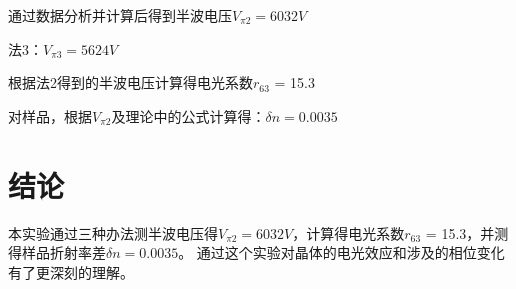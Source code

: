 \documentclass[font=default]{mpltx}
\begin{document}
通过数据分析并计算后得到半波电压$V_{\pi2} = 6032V$

法3：$V_{\pi3} = 5624V$

根据法2得到的半波电压计算得电光系数$r_{63}$ = 15.3

对样品，根据$V_{\pi2}$及理论中的公式计算得：$\delta n = 0.0035$


\section{结论}
本实验通过三种办法测半波电压得$V_{\pi2} = 6032V$，计算得电光系数$r_{63}$ = 15.3，并测得样品折射率差$\delta n = 0.0035$。
通过这个实验对晶体的电光效应和涉及的相位变化有了更深刻的理解。
\end{document}

